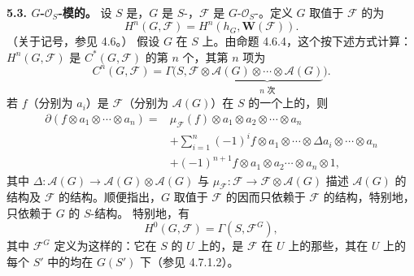 \textbf{5.3. $G$-$\mathcal O_S$-模的。} 设 $S$ 是，$G$ 是 $S$-，$\mathcal F$ 是 $G$-$\mathcal O_S$-。定义 $G$ 取值于 $\mathcal F$ 的为
\[
H^n(G,\mathcal F)=H^n(h_G,\mathbf W(\mathcal F)).
\]
（关于记号，参见 4.6。）
假设 $G$ 在 $S$ 上。由命题 4.6.4，这个按下述方式计算：$H^n(G,\mathcal F)$ 是 $C^*(G,\mathcal F)$ 的第 $n$ 个，其第 $n$ 项为
\[
C^n(G,\mathcal F)=\Gamma\bigl(S,\mathcal F\otimes\underbrace{\mathcal A(G)\otimes\cdots\otimes\mathcal A(G)}_{n\text{ 次}}\bigr).
\]
若 $f$（分别为 $a_i$）是 $\mathcal F$（分别为 $\mathcal A(G)$）在 $S$ 的一个上的，则
\[
\begin{aligned}
\partial(f\otimes a_1\otimes\cdots\otimes a_n)
={}&\mu_{\mathcal F}(f)\otimes a_1\otimes a_2\otimes\cdots\otimes a_n\\
&+\sum_{i=1}^n(-1)^if\otimes a_1\otimes\cdots\otimes\Delta a_i\otimes\cdots\otimes a_n\\
&+(-1)^{n+1}f\otimes a_1\otimes a_2\cdots\otimes a_n\otimes1,
\end{aligned}
\]
其中 $\Delta:\mathcal A(G)\to\mathcal A(G)\otimes\mathcal A(G)$ 与 $\mu_{\mathcal F}:\mathcal F\to\mathcal F\otimes\mathcal A(G)$ 描述 $\mathcal A(G)$ 的结构及 $\mathcal F$ 的结构。顺便指出，$G$ 取值于 $\mathcal F$ 的因而只依赖于 $\mathcal F$ 的结构，特别地，只依赖于 $G$ 的 $S$-结构。
特别地，有
\[
H^0(G,\mathcal F)=\Gamma(S,\mathcal F^G),
\]
其中 $\mathcal F^G$ 定义为这样的：它在 $S$ 的 $U$ 上的，是 $\mathcal F$ 在 $U$ 上的那些，其在 $U$ 上的每个 $S'$ 中的均在 $G(S')$ 下（参见 4.7.1.2）。

